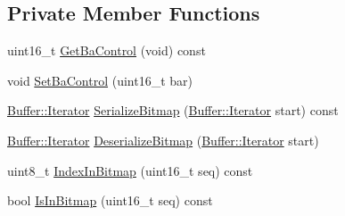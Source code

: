 \subsection*{Private Member Functions}
\begin{DoxyCompactItemize}
\item 
uint16\+\_\+t \hyperlink{classns3_1_1CtrlBAckResponseHeader_ab5a98cc153aa142f62df571caa792a58}{Get\+Ba\+Control} (void) const 
\item 
void \hyperlink{classns3_1_1CtrlBAckResponseHeader_aa4f4463bdd487c4afd27bec1a52c8d14}{Set\+Ba\+Control} (uint16\+\_\+t bar)
\item 
\hyperlink{classns3_1_1Buffer_1_1Iterator}{Buffer\+::\+Iterator} \hyperlink{classns3_1_1CtrlBAckResponseHeader_a11654e2bf8bcfe2381a57082fb696368}{Serialize\+Bitmap} (\hyperlink{classns3_1_1Buffer_1_1Iterator}{Buffer\+::\+Iterator} start) const 
\item 
\hyperlink{classns3_1_1Buffer_1_1Iterator}{Buffer\+::\+Iterator} \hyperlink{classns3_1_1CtrlBAckResponseHeader_a29c8352eaa690d42a0eaefa3985c76d0}{Deserialize\+Bitmap} (\hyperlink{classns3_1_1Buffer_1_1Iterator}{Buffer\+::\+Iterator} start)
\item 
uint8\+\_\+t \hyperlink{classns3_1_1CtrlBAckResponseHeader_aa4c749e3ad38f8b22c9488d9af5053d2}{Index\+In\+Bitmap} (uint16\+\_\+t seq) const 
\item 
bool \hyperlink{classns3_1_1CtrlBAckResponseHeader_ab25d5b7f73ddb3c750365247ca8aa396}{Is\+In\+Bitmap} (uint16\+\_\+t seq) const 
\end{DoxyCompactItemize}
